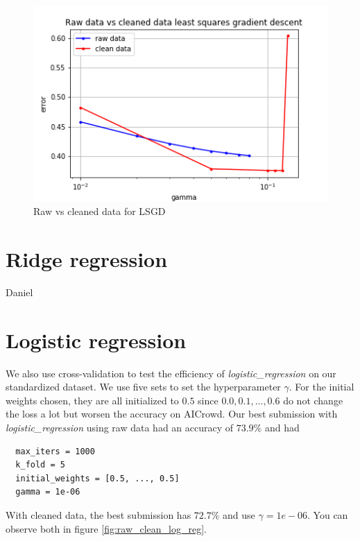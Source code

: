 \documentclass[11pt, a4paper, twocolumn]{article}
\begin{document}
\begin{figure}[h!]
  \includegraphics[width=\linewidth]{raw_vs_clean_lsgd.png}
  \caption{Raw vs cleaned data for LSGD}
    \label{fig:raw_clean_lsgd}
\end{figure}

\section{Ridge regression}
Daniel

\section{Logistic regression}
We also use cross-validation to test the efficiency of
\textit{logistic\_regression} on our standardized dataset.
We use five sets to set the hyperparameter $\gamma$.
For the initial weights chosen, they are all initialized to $0.5$ since $0.0, 0.1, ..., 0.6$ do not change the loss a lot but worsen the accuracy on AICrowd.
Our best submission with \textit{logistic\_regression} using raw data had an accuracy of $73.9\%$ and had 
\begin{lstlisting}
  max_iters = 1000
  k_fold = 5
  initial_weights = [0.5, ..., 0.5]
  gamma = 1e-06
\end{lstlisting}
With cleaned data, the best submission has $72.7\%$ and use $\gamma = 1e-06$.
You can observe both in figure \ref{fig:raw_clean_log_reg}.
\end{document}
